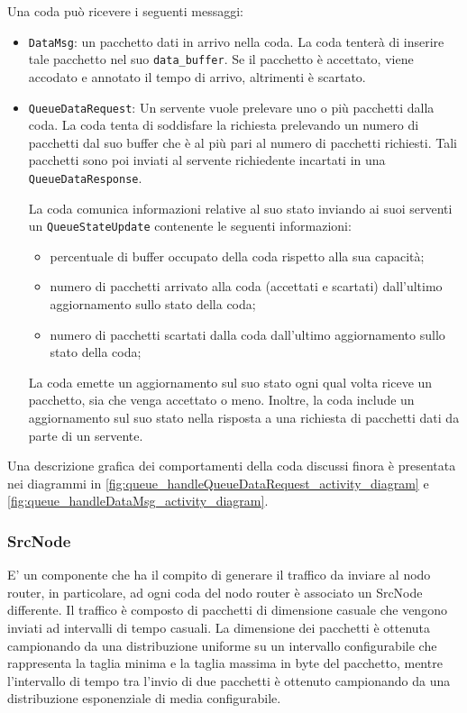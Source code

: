 \documentclass[conference]{IEEEtran}
\newcommand{\code}[1]{\texttt{#1}}
\begin{document}
Una coda può ricevere i seguenti messaggi:
\begin{itemize}
    \item \code{DataMsg}: un pacchetto dati in arrivo nella coda. La coda tenterà di
    inserire tale pacchetto nel suo \code{data\_buffer}. Se il pacchetto è accettato,
    viene accodato e annotato il tempo di arrivo, altrimenti è scartato.
    \item \code{QueueDataRequest}: Un servente vuole prelevare uno o più pacchetti
     dalla coda. La coda tenta di soddisfare la richiesta prelevando un numero di
     pacchetti dal suo buffer che è al più pari al numero di pacchetti richiesti.
     Tali pacchetti sono poi inviati al servente richiedente incartati in una
     \code{QueueDataResponse}.

La coda comunica informazioni relative al suo stato inviando ai suoi serventi un
\code{QueueStateUpdate} contenente le seguenti informazioni:
\begin{itemize}
    \item percentuale di buffer occupato della coda rispetto alla sua capacità;
    \item numero di pacchetti arrivato alla coda (accettati e scartati) dall'ultimo
    aggiornamento sullo stato della coda;
    \item numero di pacchetti scartati dalla coda dall'ultimo aggiornamento sullo stato
    della coda;
\end{itemize}
La coda emette un aggiornamento sul suo stato ogni qual volta riceve un pacchetto, sia
che venga accettato o meno. Inoltre, la coda include un aggiornamento sul suo stato
nella risposta a una richiesta di pacchetti dati da parte di un servente.    
\end{itemize}

Una descrizione grafica dei comportamenti della coda discussi finora è presentata
nei diagrammi in \autoref{fig:queue_handleQueueDataRequest_activity_diagram} e 
\autoref{fig:queue_handleDataMsg_activity_diagram}.

\subsubsection{SrcNode}
E' un componente che ha il compito di generare il traffico da inviare al nodo router, in particolare, ad ogni coda del nodo router è associato un SrcNode differente. Il traffico è composto di pacchetti di dimensione casuale che vengono inviati ad intervalli di tempo casuali. La dimensione dei pacchetti è ottenuta campionando da una distribuzione uniforme su un intervallo configurabile che rappresenta la taglia minima e la taglia massima in byte del pacchetto, mentre l'intervallo di tempo tra l'invio di due pacchetti è ottenuto campionando da una distribuzione esponenziale di media configurabile.
\end{document}
